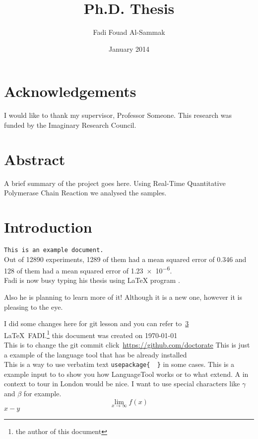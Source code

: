 \documentclass[oneside]{scrbook} %
\title{Ph.D. Thesis}
\author{Fadi Fouad Al-Sammak}
\date{January 2014}
\newcommand{\pcr}{Real-Time Quantitative Polymerase Chain Reaction } %
\begin{document}
\maketitle
\frontmatter
\tableofcontents
\listoffigures
\listoftables
\chapter{Acknowledgements}
I would like to thank my supervisor, Professor Someone. This
research was funded by the Imaginary Research Council.
\chapter{Abstract}
A brief summary of the project goes here. Using \pcr we analysed the samples.
\mainmatter
\chapter{Introduction}
\label{ch:intro}
\texttt{This is an example document.}\\
Out of \num{12890} experiments, \num{1289} of them had a mean
squared error of \num{.346} and \num{128} of them had a mean
squared error of \num{1.23e-6}.\\ 
Fadi is now busy typing his thesis using LaTeX program .\par
Also he is planning to learn more of it! Although it is a new one, however it is pleasing to the eye.\par
I did some changes here for git lesson and you can refer to~\ref{ch:intro}\\
\LaTeX\ {FADI.}\footnote{the author of this document}
this document was created on \today\\
This is to change the git commit click~\url{https://github.com/doctorate}
This is just a example of the  language tool that has be already installed \\
This is a way to use verbatim text \verb*|usepackage{  }| in some cases.  
This is a example input to to show you how LanguageTool works or to what extend.
A in context to  tour in London would be nice. I want to use special characters like $\gamma$ and $\beta$ for example.\\
\[ \lim_{x\to\infty} f(x) \]
$ x -y $
\end{document}
